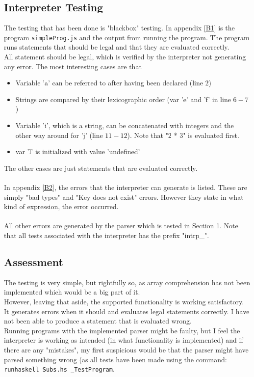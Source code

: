 \documentclass[a4paper]{article}
\begin{document}
\subsection{Interpreter Testing}
The testing that has been done is "blackbox" testing. In appendix \ref{B1} is the program \texttt{simpleProg.js} and the output from running the program. The program runs statements that should be legal and that they are evaluated correctly. \\
All statement should be legal, which is verified by the interpreter not generating any error. The most interesting cases are that
\begin{itemize}
\item Variable 'a' can be referred to after having been declared (line $2$)
\item Strings are compared by their lexicographic order (var 'e' and 'f' in line $6-7$)
\item Variable 'i', which is a string, can be concatenated with integers and the other way around for 'j' (line $11-12$). Note that "2 * 3" is evaluated first.
\item var 'l' is initialized with value 'undefined'
\end{itemize}
The other cases are just statements that are evaluated correctly.\\
\\
In appendix \ref{B2}, the errors that the interpreter can generate is listed. These are simply "bad types" and "Key does not exist" errors. However they state in what kind of expression, the error occurred.\\
\\
All other errors are generated by the parser which is tested in Section 1. Note that all tests associated with the interpreter has the prefix "intrp\_".

\subsection{Assessment}
The testing is very simple, but rightfully so, as array comprehension has not been implemented which would be a big part of it. \\
However, leaving that aside, the supported functionality is working satisfactory. It generates errors when it should and evaluates legal statements correctly. I have not been able to produce a statement that is evaluated wrong. \\
Running programs with the implemented parser might be faulty, but I feel the interpreter is working as intended (in what functionality is implemented) and if there are any "mistakes", my first suspicious would be that the parser might have parsed something wrong (as all tests have been made using the command: \texttt{runhaskell Subs.hs \_TestProgram}.
\end{document}

